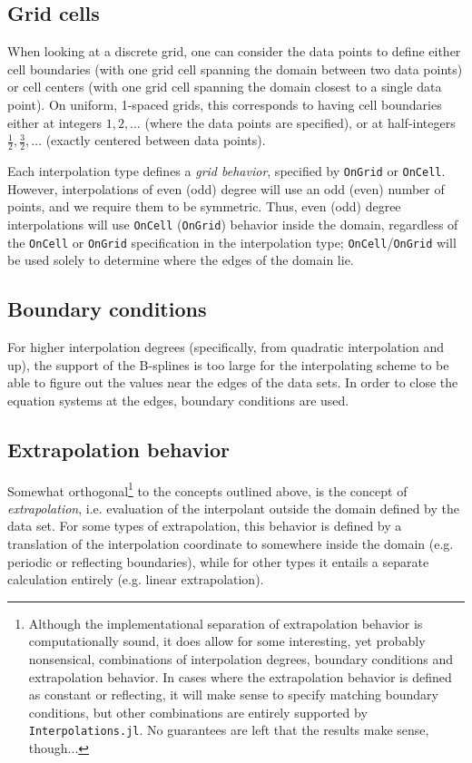 \documentclass{article}
\begin{document}
\subsection{Grid cells}

When looking at a discrete grid, one can consider the data points to define either cell boundaries (with one grid cell spanning the domain between two data points) or cell centers (with one grid cell spanning the domain closest to a single data point). On uniform, 1-spaced grids, this corresponds to having cell boundaries either at integers $1, 2, \ldots$ (where the data points are specified), or at half-integers $\frac{1}{2}, \frac{3}{2}, \ldots$ (exactly centered between data points).

Each interpolation type defines a \emph{grid behavior}, specified by \texttt{OnGrid} or \texttt{OnCell}. However, interpolations of even (odd) degree will use an odd (even) number of points, and we require them to be symmetric. Thus, even (odd) degree interpolations will use \texttt{OnCell} (\texttt{OnGrid}) behavior inside the domain, regardless of the \texttt{OnCell} or \texttt{OnGrid} specification in the interpolation type; \texttt{OnCell}/\texttt{OnGrid} will be used solely to determine where the edges of the domain lie.

\subsection{Boundary conditions}

For higher interpolation degrees (specifically, from quadratic interpolation and up), the support of the B-splines is too large for the interpolating scheme to be able to figure out the values near the edges of the data sets. In order to close the equation systems at the edges, boundary conditions are used.

\subsection{Extrapolation behavior}

Somewhat orthogonal\footnote{Although the implementational separation of extrapolation behavior is computationally sound, it does allow for some interesting, yet probably nonsensical, combinations of interpolation degrees, boundary conditions and extrapolation behavior. In cases where the extrapolation behavior is defined as constant or reflecting, it will make sense to specify matching boundary conditions, but other combinations are entirely supported by \texttt{Interpolations.jl}. No guarantees are left that the results make sense, though...} to the concepts outlined above, is the concept of \emph{extrapolation}, i.e. evaluation of the interpolant outside the domain defined by the data set. For some types of extrapolation, this behavior is defined by a translation of the interpolation coordinate to somewhere inside the domain (e.g. periodic or reflecting boundaries), while for other types it entails a separate calculation entirely (e.g. linear extrapolation).
\end{document}
